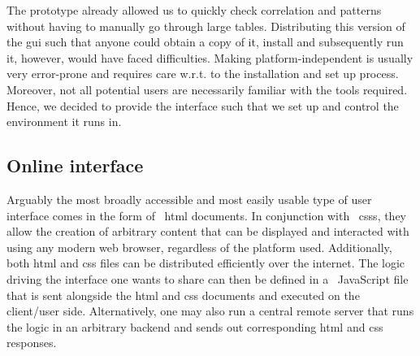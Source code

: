 \documentclass[\relativeRoot/main.tex]{subfiles}
\begin{document}
The prototype already allowed us to quickly check correlation and patterns without having to manually go through large tables. Distributing this version of the \gls{gui} such that anyone could obtain a copy of it, install and subsequently run it, however, would have faced difficulties. Making  platform-independent is usually very error-prone and requires care w.r.t. to the installation and set up process. Moreover, not all potential users are necessarily familiar with the tools required. Hence, we decided to provide the interface such that we set up and control the environment it runs in.

\subsection*{Online interface}
\label{subsec:lyprox:motivation:online}

Arguably the most broadly accessible and most easily usable type of user interface comes in the form of ~\acrshort{html} documents. In conjunction with ~\glspl{css}, they allow the creation of arbitrary content that can be displayed and interacted with using any modern web browser, regardless of the platform used. Additionally, both \acrshort{html} and \acrshort{css} files can be distributed efficiently over the internet. The logic driving the interface one wants to share can then be defined in a ~JavaScript file that is sent alongside the \acrshort{html} and \acrshort{css} documents and executed on the client/user side. Alternatively, one may also run a central remote server that runs the logic in an arbitrary backend and sends out corresponding \acrshort{html} and \acrshort{css} responses.
\end{document}

